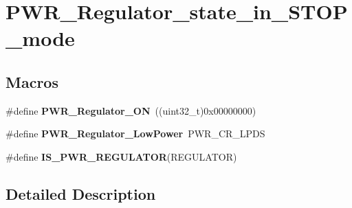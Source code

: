 \hypertarget{group___p_w_r___regulator__state__in___s_t_o_p__mode}{\section{P\-W\-R\-\_\-\-Regulator\-\_\-state\-\_\-in\-\_\-\-S\-T\-O\-P\-\_\-mode}
\label{group___p_w_r___regulator__state__in___s_t_o_p__mode}
}
\subsection*{Macros}
\begin{DoxyCompactItemize}
\item 
\hypertarget{group___p_w_r___regulator__state__in___s_t_o_p__mode_gabf58b999bff6b4bf0fb5b97d74a75683}{\#define {\bfseries P\-W\-R\-\_\-\-Regulator\-\_\-\-O\-N}~((uint32\-\_\-t)0x00000000)}\label{group___p_w_r___regulator__state__in___s_t_o_p__mode_gabf58b999bff6b4bf0fb5b97d74a75683}

\item 
\hypertarget{group___p_w_r___regulator__state__in___s_t_o_p__mode_ga13745136d094661358d373b67ebf1ac7}{\#define {\bfseries P\-W\-R\-\_\-\-Regulator\-\_\-\-Low\-Power}~P\-W\-R\-\_\-\-C\-R\-\_\-\-L\-P\-D\-S}\label{group___p_w_r___regulator__state__in___s_t_o_p__mode_ga13745136d094661358d373b67ebf1ac7}

\item 
\#define {\bfseries I\-S\-\_\-\-P\-W\-R\-\_\-\-R\-E\-G\-U\-L\-A\-T\-O\-R}(R\-E\-G\-U\-L\-A\-T\-O\-R)
\end{DoxyCompactItemize}


\subsection{Detailed Description}


